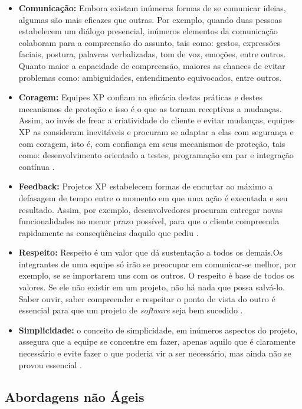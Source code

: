 \documentclass{acm_proc_article-sp}
\begin{document}
\begin{itemize}
\item \textbf{Comunicação:} Embora existam inúmeras formas de se comunicar ideias, algumas são mais eficazes que outras. Por exemplo, quando duas pessoas estabelecem um diálogo presencial, inúmeros elementos da comunicação colaboram para a compreensão do assunto, tais como: gestos, expressões faciais, postura, palavras verbalizadas, tom de voz, emoções, entre outros. Quanto maior a capacidade de compreensão, maiores as chances de evitar problemas como: ambiguidades, entendimento equivocados, entre outros\cite{xp:agil}.
\item \textbf{Coragem:} Equipes XP confiam na eficácia destas práticas e destes mecanismos de proteção e isso é o que as tornam receptivas a mudanças. Assim, ao invés de frear a criatividade do cliente e evitar mudanças, equipes XP as consideram inevitáveis e procuram se adaptar a elas com segurança e com coragem, isto é, com confiança em seus mecanismos de proteção, tais como: desenvolvimento orientado a testes, programação em par e integração contínua \cite{xp:agil}.
\item \textbf{Feedback:} Projetos XP estabelecem formas de encurtar ao máximo a defasagem de tempo entre o momento em que uma ação é executada e seu resultado. Assim, por exemplo, desenvolvedores procuram entregar novas funcionalidades no menor prazo possível, para que o cliente compreenda rapidamente as conseqüências daquilo que pediu \cite{xp:agil}.
\item \textbf{Respeito:} Respeito é um valor que dá sustentação a todos os demais.Os integrantes de uma equipe só irão se preocupar em comunicar-se melhor, por exemplo, se se importarem uns com os outros. O respeito é base de todos os valores. Se ele não existir em um projeto, não há nada que possa salvá-lo. Saber ouvir, saber compreender e respeitar o ponto de vista do outro é essencial para que um projeto de \textit{software} seja bem sucedido \cite{xp:agil}.
\item \textbf{Simplicidade:} o conceito de simplicidade, em inúmeros aspectos do projeto, assegura que a equipe se concentre em fazer, apenas aquilo que é claramente necessário e evite fazer o que poderia vir a ser necessário, mas ainda não se provou essencial \cite{xp:agil}.
\end{itemize}

\subsection{Abordagens não Ágeis}
\end{document}
